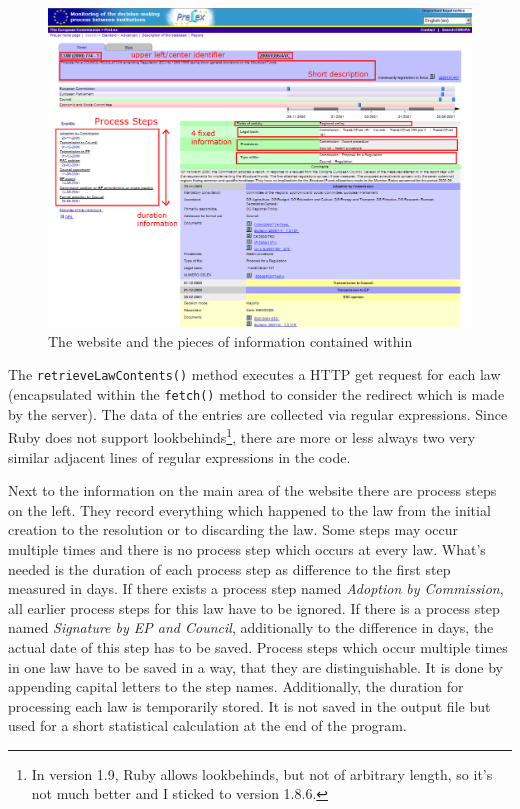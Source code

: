\documentclass{scrartcl}
\begin{document}
  \begin{figure}[ht]
  \begin{center}
  \includegraphics[width = \textwidth]{Website.png}
  \caption{The website and the pieces of information contained within}
  \label{Website}
  \end{center}
  \end{figure}


The \texttt{retrieveLawContents()} method executes a HTTP get request for each law (encapsulated within the \texttt{fetch()} method to consider the redirect which is made by the server). The data of the entries are collected via regular expressions. Since Ruby does not support lookbehinds\footnote{In version 1.9, Ruby allows lookbehinds, but not of arbitrary length, so it's not much better and I sticked to version 1.8.6.}, there are more or less always two very similar adjacent lines of regular expressions in the code.

Next to the information on the main area of the website there are process steps on the left. They record everything which happened to the law from the initial creation to the resolution or to discarding the law. Some steps may occur multiple times and there is no process step which occurs at every law. What's needed is the duration of each process step as difference to the first step measured in days. If there exists a process step named \textit{Adoption by Commission}, all earlier process steps for this law have to be ignored. If there is a process step named \textit{Signature by EP and Council}, additionally to the difference in days, the actual date of this step has to be saved. Process steps which occur multiple times in one law have to be saved in a way, that they are distinguishable. It is done by appending capital letters to the step names. Additionally, the duration for processing each law is temporarily stored. It is not saved in the output file but used for a short statistical calculation at the end of the program.
\end{document}
